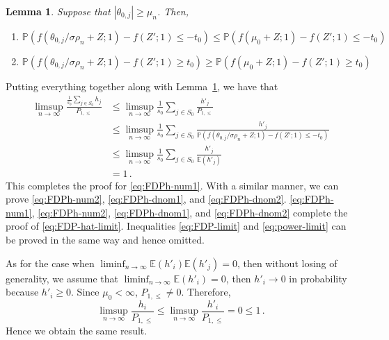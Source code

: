 \documentclass[11pt]{article}
\newtheorem{lemma}{Lemma}%
\newcommand{\Expected}{\mathbb{E}}
\newcommand{\Prob}{\mathbb{P}}
\begin{document}
\begin{lemma}\label{lem:prob-bounds-mu}
    Suppose that $|\theta_{0,j}|\geq \mu_n$. Then,
    \begin{enumerate}
        \item $\Prob(f(\theta_{0,j}/\sigma\rho_n+Z;1)-f(Z';1)\leq -t_0)\leq \Prob(f(\mu_0+Z;1)-f(Z';1)\leq -t_0)$
        \item $\Prob(f(\theta_{0,j}/\sigma\rho_n+Z;1)-f(Z';1)\geq t_0)\geq \Prob(f(\mu_0+Z;1)-f(Z';1)\geq t_0)$
    \end{enumerate}
\end{lemma}
Putting everything together along with Lemma~\ref{lem:prob-bounds-mu}, we have that
\begin{align*}
    \limsup_{n\to\infty}\frac{\frac{1}{s_0}\sum_{j\in S_0} h_j}{P_{1,\leq}}&\leq \limsup_{n\to\infty}\frac{1}{s_0}\sum_{j\in S_0} \frac{h'_j}{P_{1,\leq}}\\
    &\leq \limsup_{n\to \infty}\frac{1}{s_0}\sum_{j\in S_0}\frac{h'_j}{\Prob(f(\theta_{0,j}/\sigma\rho_n+Z;1)-f(Z';1)\leq -t_0)}\\
    &\leq  \limsup_{n\to\infty}\frac{1}{s_0}\sum_{j\in S_0}\frac{h'_j}{\Expected(h'_j)}\\
    &= 1\,.
\end{align*}
This completes the proof for \eqref{eq:FDPh-num1}. With a similar manner, we can prove \eqref{eq:FDPh-num2}, \eqref{eq:FDPh-dnom1}, and \eqref{eq:FDPh-dnom2}. \eqref{eq:FDPh-num1}, \eqref{eq:FDPh-num2}, \eqref{eq:FDPh-dnom1}, and \eqref{eq:FDPh-dnom2} complete the proof of \eqref{eq:FDP-hat-limit}. Inequalities \eqref{eq:FDP-limit} and \eqref{eq:power-limit} can be proved in the same way and hence omitted.

As for the case when $\liminf_{n\to\infty}\Expected(h'_i)\Expected(h'_j)=0$, then without losing of generality, we assume that $\liminf_{n\to\infty}\Expected(h'_i)=0$, then $h'_i\to 0$ in probability because $h'_i\ge 0$. Since $\mu_0<\infty$, $P_{1,\le}\neq 0$. Therefore, 
\[
\limsup_{n\to\infty}\frac{h_i}{P_{1,\le}}\le \limsup_{n\to\infty}\frac{h'_i}{P_{1,\le}}=0\le1\,.
\]
Hence we obtain the same result.
\end{document}
